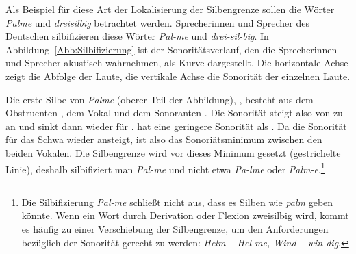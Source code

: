 Als Beispiel für diese Art der Lokalisierung der Silbengrenze sollen die Wörter \textit{Palme} und \textit{dreisilbig} betrachtet werden. Sprecherinnen und Sprecher des Deutschen silbifizieren diese Wörter \textit{Pal-me} und \textit{drei-sil-big}. In Abbildung~\ref{Abb:Silbifizierung} ist der Sonoritätsverlauf, den die Sprecherinnen und Sprecher akustisch wahrnehmen, als Kurve dargestellt. Die horizontale Achse zeigt die Abfolge der Laute, die vertikale Achse die Sonorität der einzelnen Laute.

Die erste Silbe von \textit{Palme} (oberer Teil der Abbildung), \textipa{[pal]}, besteht aus dem Obstruenten \textipa{[p]}, dem Vokal \textipa{[a]} und dem Sonoranten \textipa{[l]}. Die Sonorität steigt also von \textipa{[p]} zu \textipa{[a]} an und sinkt dann wieder für \textipa{[l]}. \textipa{[m]} hat eine geringere Sonorität als \textipa{[l]}. Da die Sonorität für das Schwa wieder ansteigt, ist \textipa{[m]} also das Sonoriätsminimum zwischen den beiden Vokalen. Die Silbengrenze wird vor dieses Minimum gesetzt (gestrichelte Linie), deshalb silbifiziert man \textit{Pal-me} und nicht etwa \textit{Pa-lme} oder \textit{Palm-e}.\footnote{Die Silbifizierung \textit{Pal-me} schließt nicht aus, dass es Silben wie \textit{palm} geben könnte. Wenn ein Wort durch Derivation oder Flexion zweisilbig wird, kommt es häufig zu einer Verschiebung der Silbengrenze, um den Anforderungen bezüglich der Sonorität gerecht zu werden: \textit{Helm -- Hel-me, Wind -- win-dig}.}



